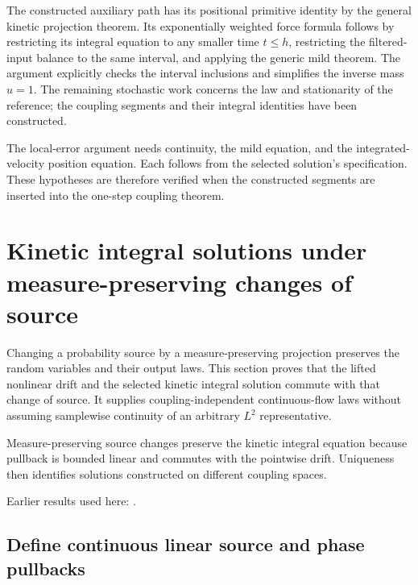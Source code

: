 \documentclass[11pt,a4paper]{report}
\begin{document}
The constructed auxiliary path has its positional primitive identity by the general kinetic projection theorem. Its exponentially weighted force formula follows by restricting its integral equation to any smaller time \(t\le h\), restricting the filtered-input balance to the same interval, and applying the generic mild theorem. The argument explicitly checks the interval inclusions and simplifies the inverse mass \(u=1\). The remaining stochastic work concerns the law and stationarity of the reference; the coupling segments and their integral identities have been constructed.



The local-error argument needs continuity, the mild equation, and the integrated-velocity position equation. Each follows from the selected solution’s specification. These hypotheses are therefore verified when the constructed segments are inserted into the one-step coupling theorem.

\section{\texorpdfstring{Kinetic integral solutions under measure-preserving changes of source}{Kinetic integral solutions under measure-preserving changes of source}}
\label{proof-module-KineticLangevin-FlowPullback-lean}


Changing a probability source by a measure-preserving projection preserves the random variables and their output laws. This section proves that the lifted nonlinear drift and the selected kinetic integral solution commute with that change of source. It supplies coupling-independent continuous-flow laws without assuming samplewise continuity of an arbitrary \(L^{2}\) representative.



Measure-preserving source changes preserve the kinetic integral equation because pullback is bounded linear and commutes with the pointwise drift. Uniqueness then identifies solutions constructed on different coupling spaces.



Earlier results used here: \cite[Section~3.13]{LangevinLean2026ULASC}.
\subsection{\texorpdfstring{Define continuous linear source and phase pullbacks}{Define continuous linear source and phase pullbacks}}
\label{report-step-KineticLangevin-FlowPullback-lean-1}
\end{document}

